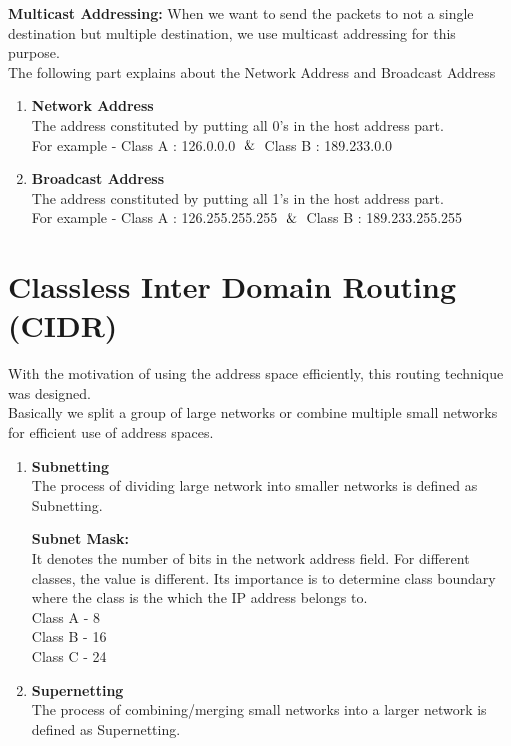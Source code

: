 \documentclass[12pt]{article}
\begin{document}
\textbf{Multicast Addressing:}
    When we want to send the packets to not a single destination but multiple destination, we use multicast addressing for this purpose. \\

The following part explains about the Network Address and Broadcast Address
\begin{enumerate}
    \item \textbf{Network Address} \\
        The address constituted by putting all 0's in the host address part. \\
        For example - Class A : 126.0.0.0 $\And$ Class B : 189.233.0.0
    \item \textbf{Broadcast Address} \\
        The address constituted by putting all 1's in the host address part. \\
        For example - Class A : 126.255.255.255 $\And$ Class B : 189.233.255.255
\end{enumerate}

\section{Classless Inter Domain Routing (CIDR)}

With the motivation of using the address space efficiently, this routing technique was designed. \\
Basically we split a group of large networks or combine multiple small networks for efficient use of address spaces.

\begin{enumerate}
    \item \textbf{Subnetting} \\
        The process of dividing large network into smaller networks is defined as Subnetting.
        
        \textbf{Subnet Mask:} \\
        It denotes the number of bits in the network address field. For different classes, the value is different. Its importance is to determine class boundary where the class is the which the IP address belongs to.\\
        Class A - 8 \\
        Class B - 16 \\
        Class C - 24 \\
        
    \item \textbf{Supernetting} \\
        The process of combining/merging small networks into a larger network is defined as Supernetting.
\end{enumerate}
\end{document}
